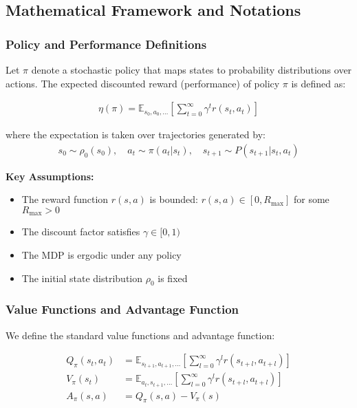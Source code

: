 \subsection{Mathematical Framework and Notations}

\subsubsection{Policy and Performance Definitions}

Let $\pi$ denote a stochastic policy that maps states to probability distributions over actions. The expected discounted reward (performance) of policy $\pi$ is defined as:

\begin{align*}
    \eta(\pi) = \mathbb{E}_{s_0, a_0, \ldots} \left[\sum_{t = 0}^{\infty} \gamma^t r(s_t, a_t)\right]
\end{align*}

where the expectation is taken over trajectories generated by:
\begin{align*}
    s_0 \sim \rho_0(s_0), \quad a_t \sim \pi(a_t | s_t), \quad s_{t + 1} \sim P(s_{t + 1} | s_t, a_t)
\end{align*}

\textbf{Key Assumptions:}
\begin{itemize}
    \item The reward function $r(s,a)$ is bounded: $r(s,a) \in [0, R_{\max}]$ for some $R_{\max} > 0$
    \item The discount factor satisfies $\gamma \in [0, 1)$
    \item The MDP is ergodic under any policy
    \item The initial state distribution $\rho_0$ is fixed
\end{itemize}

\subsubsection{Value Functions and Advantage Function}

We define the standard value functions and advantage function:

\begin{align*}
    Q_\pi(s_t, a_t) &= \mathbb{E}_{s_{t+1}, a_{t+1}, \ldots} \left[\sum_{l = 0}^{\infty} \gamma^l r(s_{t + l}, a_{t + l})\right] \\
    V_\pi(s_t) &= \mathbb{E}_{a_t, s_{t+1}, \ldots} \left[\sum_{l = 0}^{\infty} \gamma^l r(s_{t + l}, a_{t + l})\right] \\
    A_\pi(s, a) &= Q_\pi(s, a) - V_\pi(s)
\end{align*}

